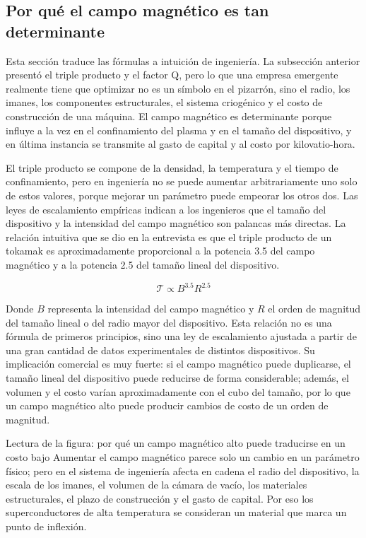 \subsection{Por qué el campo magnético es tan determinante}

Esta sección traduce las fórmulas a intuición de ingeniería. La subsección anterior presentó el triple producto y el factor Q, pero lo que una empresa emergente realmente tiene que optimizar no es un símbolo en el pizarrón, sino el radio, los imanes, los componentes estructurales, el sistema criogénico y el costo de construcción de una máquina. El campo magnético es determinante porque influye a la vez en el confinamiento del plasma y en el tamaño del dispositivo, y en última instancia se transmite al gasto de capital y al costo por kilovatio-hora.

El triple producto se compone de la densidad, la temperatura y el tiempo de confinamiento, pero en ingeniería no se puede aumentar arbitrariamente uno solo de estos valores, porque mejorar un parámetro puede empeorar los otros dos. Las leyes de escalamiento empíricas indican a los ingenieros que el tamaño del dispositivo y la intensidad del campo magnético son palancas más directas. La relación intuitiva que se dio en la entrevista es que el triple producto de un tokamak es aproximadamente proporcional a la potencia 3.5 del campo magnético y a la potencia 2.5 del tamaño lineal del dispositivo.

\[
\mathcal{T}\propto B^{3.5}R^{2.5}
\]

Donde $B$ representa la intensidad del campo magnético y $R$ el orden de magnitud del tamaño lineal o del radio mayor del dispositivo. Esta relación no es una fórmula de primeros principios, sino una ley de escalamiento ajustada a partir de una gran cantidad de datos experimentales de distintos dispositivos. Su implicación comercial es muy fuerte: si el campo magnético puede duplicarse, el tamaño lineal del dispositivo puede reducirse de forma considerable; además, el volumen y el costo varían aproximadamente con el cubo del tamaño, por lo que un campo magnético alto puede producir cambios de costo de un orden de magnitud.

\begin{knowledgebox}{Lectura de la figura: por qué un campo magnético alto puede traducirse en un costo bajo}
Aumentar el campo magnético parece solo un cambio en un parámetro físico; pero en el sistema de ingeniería afecta en cadena el radio del dispositivo, la escala de los imanes, el volumen de la cámara de vacío, los materiales estructurales, el plazo de construcción y el gasto de capital. Por eso los superconductores de alta temperatura se consideran un material que marca un punto de inflexión.
\end{knowledgebox}

